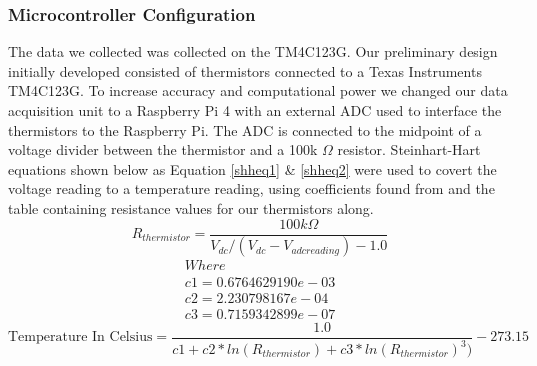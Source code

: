 \subsubsection{Microcontroller Configuration}
The data we collected was collected on the TM4C123G. Our preliminary design initially developed consisted of thermistors connected to a Texas Instruments TM4C123G. To increase accuracy and computational power we changed our data acquisition unit to a Raspberry Pi 4 with an external ADC used to interface the thermistors to the Raspberry Pi. The ADC is connected to the midpoint of a voltage divider between the thermistor and a 100k $\Omega$ resistor. Steinhart-Hart equations shown below as Equation \ref{shheq1} \& \ref{shheq2} were used to covert the voltage reading to a temperature reading, using coefficients found from \cite{shheq} and the table \cite{ttable} containing resistance values for our thermistors along.    
\begin{equation} \label{shheq1}
    R_{thermistor} = \frac{100k \Omega}{ V_{dc} / (V_{dc} - V_{adc reading}) - 1.0}
\end{equation}
\begin{align*}
Where \\
c1 = 0.6764629190e-03 \\
c2 = 2.230798167e-04 \\
c3 = 0.7159342899e-07
\end{align*}
\begin{equation} \label{shheq2}
    \text{Temperature In Celsius} = \frac{1.0}{c1 + c2 * ln(R_{thermistor}) + c3 * ln(R_{thermistor})^3)} - 273.15
\end{equation}

